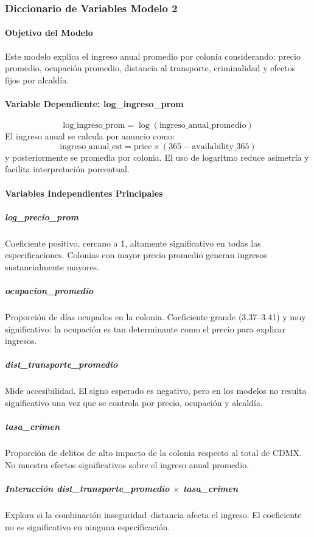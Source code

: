 \documentclass[12pt]{article}
\begin{document}
\subsubsection*{Diccionario de Variables Modelo 2}

\paragraph{Objetivo del Modelo}
Este modelo explica el ingreso anual promedio por colonia considerando: precio promedio, ocupación promedio, distancia al transporte, criminalidad y efectos fijos por alcaldía.

\paragraph{Variable Dependiente: log\_ingreso\_prom}
\[
\text{log\_ingreso\_prom} = \log(\text{ingreso\_anual\_promedio})
\]
El ingreso anual se calcula por anuncio como:
\[
\text{ingreso\_anual\_est} = \text{price} \times (365 - \text{availability\_365})
\]
y posteriormente se promedia por colonia. El uso de logaritmo reduce asimetría y facilita interpretación porcentual.

\paragraph{Variables Independientes Principales}

\subparagraph{log\_precio\_prom}
Coeficiente positivo, cercano a 1, altamente significativo en todas las especificaciones. Colonias con mayor precio promedio generan ingresos sustancialmente mayores.

\subparagraph{ocupacion\_promedio}
Proporción de días ocupados en la colonia. Coeficiente grande (3.37–3.41) y muy significativo: la ocupación es tan determinante como el precio para explicar ingresos.

\subparagraph{dist\_transporte\_promedio}
Mide accesibilidad. El signo esperado es negativo, pero en los modelos no resulta significativo una vez que se controla por precio, ocupación y alcaldía.

\subparagraph{tasa\_crimen}
Proporción de delitos de alto impacto de la colonia respecto al total de CDMX. No muestra efectos significativos sobre el ingreso anual promedio.

\subparagraph{Interacción dist\_transporte\_promedio $\times$ tasa\_crimen}
Explora si la combinación inseguridad–distancia afecta el ingreso. El coeficiente no es significativo en ninguna especificación.
\end{document}
